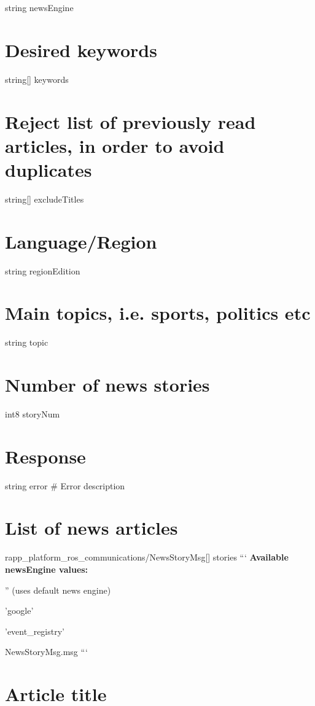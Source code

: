 string news\-Engine \section*{Desired keywords}

string\mbox{[}\mbox{]} keywords \section*{Reject list of previously read articles, in order to avoid duplicates}

string\mbox{[}\mbox{]} exclude\-Titles \section*{Language/\-Region}

string region\-Edition \section*{Main topics, i.\-e. sports, politics etc}

string topic \section*{Number of news stories}

int8 story\-Num 

 \section*{Response}

string error \# Error description

\section*{List of news articles}

rapp\-\_\-platform\-\_\-ros\-\_\-communications/\-News\-Story\-Msg\mbox{[}\mbox{]} stories ``` {\bfseries Available news\-Engine values\-:}
\begin{DoxyItemize}
\item '' (uses default news engine)
\item 'google'
\item 'event\-\_\-registry'
\end{DoxyItemize}

News\-Story\-Msg.\-msg ``` \section*{Article title}

